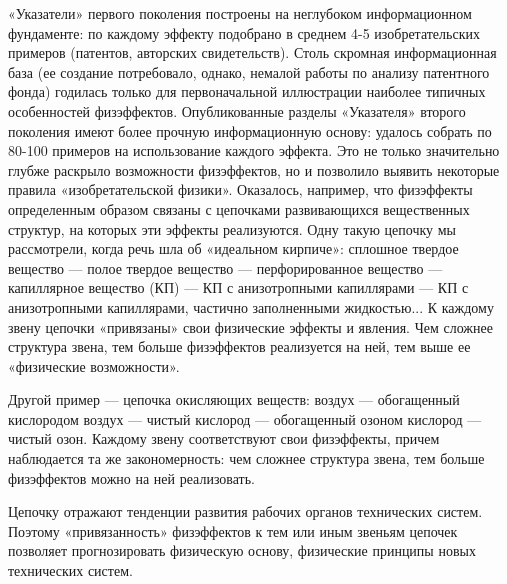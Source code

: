 «Указатели» первого  поколения построены на  неглубоком информационном
фундаменте:   по    каждому   эффекту   подобрано   в    среднем   4-5
изобретательских  примеров (патентов,  авторских свидетельств).  Столь
скромная  информационная   база  (ее  создание   потребовало,  однако,
немалой  работы  по  анализу  патентного фонда)  годилась  только  для
первоначальной иллюстрации наиболее типичных особенностей физэффектов.
Опубликованные  разделы  «Указателя»  второго  поколения  имеют  более
прочную информационную  основу: удалось собрать по  80-100 примеров на
использование  каждого  эффекта.  Это  не  только  значительно  глубже
раскрыло  возможности физэффектов,  но и  позволило выявить  некоторые
правила «изобретательской физики». Оказалось, например, что физэффекты
определенным  образом связаны  с цепочками  развивающихся вещественных
структур, на  которых эти эффекты  реализуются. Одну такую  цепочку мы
рассмотрели, когда  речь шла об «идеальном  кирпиче»: сплошное твердое
вещество  —  полое  твердое  вещество  —  перфорированное  вещество  —
капиллярное  вещество  (КП) —  КП  с  анизотропными капиллярами  —  КП
с  анизотропными  капиллярами,  частично заполненными  жидкостью...  К
каждому звену  цепочки «привязаны» свои физические  эффекты и явления.
Чем  сложнее структура  звена, тем  больше физэффектов  реализуется на
ней, тем выше ее «физические возможности».

Другой  пример  — цепочка  окисляющих  веществ:  воздух —  обогащенный
кислородом воздух  — чистый кислород  — обогащенный озоном  кислород —
чистый  озон.  Каждому  звену соответствуют  свои  физэффекты,  причем
наблюдается  та же  закономерность: чем  сложнее структура  звена, тем
больше физэффектов можно на ней реализовать.

Цепочку  отражают  тенденции   развития  рабочих  органов  технических
систем.  Поэтому «привязанность»  физэффектов к  тем или  иным звеньям
цепочек   позволяет  прогнозировать   физическую  основу,   физические
принципы новых технических систем.

